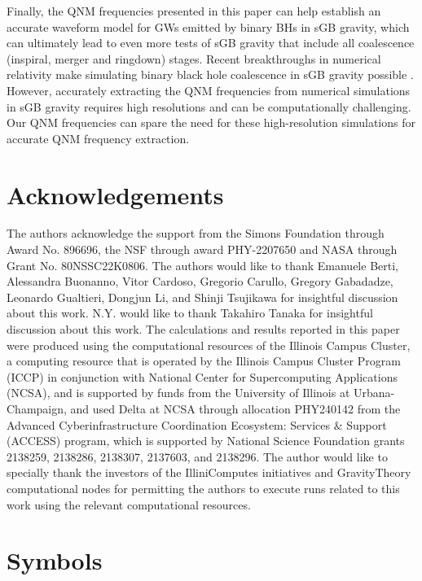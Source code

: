 \documentclass[aps,prx,amsmath,floats,floatfix,twocolumn,
  superscriptaddress,nofootinbib,showpacs]{revtex4-1}
\begin{document}
Finally, the QNM frequencies presented in this paper can help establish an accurate waveform model for GWs emitted by binary BHs in sGB gravity, which can ultimately lead to even more tests of sGB gravity that include all coalescence  (inspiral, merger and ringdown) stages. 
Recent breakthroughs in numerical relativity make simulating binary black hole coalescence in sGB gravity possible \cite{AresteSalo:2022hua, AresteSalo:2023hcp, AresteSalo:2023hcp}. 
However, accurately extracting the QNM frequencies from numerical simulations in sGB gravity requires high resolutions and can be computationally challenging. 
Our QNM frequencies can spare the need for these high-resolution simulations for accurate QNM frequency extraction. 
 
\section*{Acknowledgements}

The authors acknowledge the support from the Simons Foundation through Award No. 896696, the NSF through award PHY-2207650 and NASA through Grant No. 80NSSC22K0806. 
The authors would like to thank Emanuele Berti, Alessandra Buonanno, Vitor Cardoso, Gregorio Carullo, Gregory Gabadadze, Leonardo Gualtieri, Dongjun Li, and Shinji Tsujikawa for insightful discussion about this work. 
N.Y. would like to thank Takahiro Tanaka for insightful discussion about this work. 
The calculations and results reported in this paper were produced using the computational resources of the Illinois Campus Cluster, a computing resource that is operated by the Illinois Campus Cluster Program (ICCP) in conjunction with National Center for Supercomputing Applications (NCSA), and is supported by funds from the University of Illinois at Urbana-Champaign, and used Delta at NCSA through allocation PHY240142 from the Advanced Cyberinfrastructure Coordination Ecosystem: Services $\&$ Support (ACCESS) program, which is supported by National Science Foundation grants 2138259, 2138286, 2138307, 2137603, and 2138296.
The author would like to specially thank the investors of the IlliniComputes initiatives and GravityTheory computational nodes for permitting the authors to execute runs related to this work using the relevant computational resources. 

\appendix

\section{Symbols}
\label{sec:Appendix_A}
\end{document}
